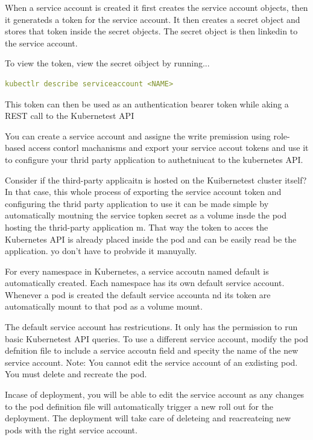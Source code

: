 \documentclass[11pt]{book}
\begin{document}
    When a service account is created it first creates the service account objects, then it generateds a token for the service account.
    It then creates a secret object and stores that token inside the secret objects.
    The secret object is then linkedin to the service account.


    To view the token, view the secret oibject by running...

    \begin{lstlisting}[language=yaml, caption={Commands}]
        kubectlr describe serviceaccount <NAME>
    \end{lstlisting}

    This token can then be used as an authentication bearer token while aking a REST call to the Kubernetest API

    You can create a service account and assigne the write premission using role-based access contorl machanisms and export your service accout tokens
    and use it to configure your thrid party application to authetniucat to the kubernetes API.

    Consider if the third-party applicaitn is hosted on the Kuibernetest cluster itself?
    In that case, this whole process of exporting the service account token and configuring the thrid party application to use it can be made simple by automatically moutning the service topken secret as a volume insde the pod hosting the thrid-party application m.
    That way the token to acces the Kubernetes API is already placed inside the pod and can be easily read be the application.
    yo don't have to probvide it manuyally.

    For every namespace in Kubernetes, a service accoutn named default is automatically created.
    Each namespace has its own default service account.
    Whenever a pod is created the default service accounta nd its token are automatically mount to that pod as a volume mount.

    The default service account has restricutions.
    It only has the permission to run basic Kubernetest API queries.
    To use a different service account, modify the pod defnition file to include a service accoutn field and specity the name of the new service account.
    Note: You cannot edit the service account of an exdisting pod. You must delete and recreate the pod.


    Incase of deployment, you will be able to edit the service account as any changes to the pod definition file will automatically trigger a new roll out for the deployment.
    The deployment will take care of deleteing and reacreateing new pods with the right service account.
\end{document}
